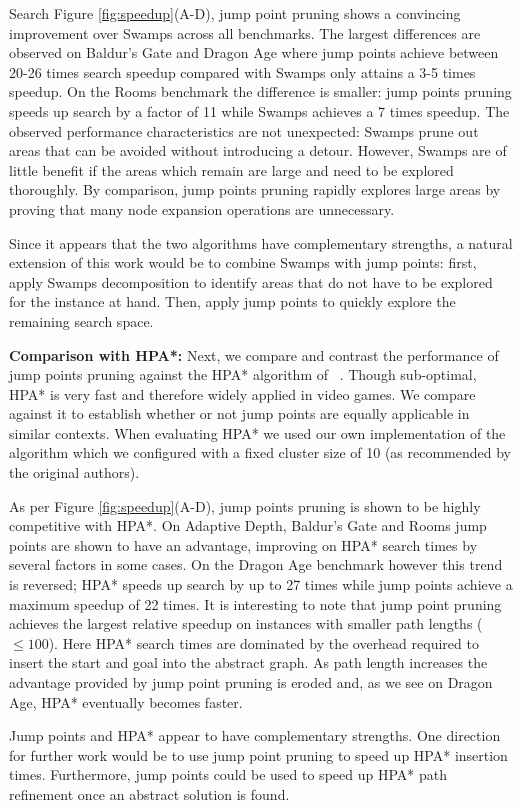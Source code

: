 Search Figure \ref{fig:speedup}(A-D), jump point pruning shows a convincing
improvement over Swamps across all benchmarks. 
The largest differences are observed on Baldur's Gate and Dragon Age where jump 
points achieve between 20-26 times search speedup compared with Swamps
only attains a 3-5 times speedup.
On the Rooms benchmark the difference is smaller: jump points pruning
speeds up search by a factor of 11 while Swamps achieves a 7 times
speedup.
The observed performance characteristics are not unexpected: Swamps prune out
areas that can be avoided without introducing a detour. However, Swamps are of
little benefit if the areas which remain are large and need to be explored 
thoroughly.
By comparison, jump points pruning rapidly explores large areas by proving
that many node expansion operations are unnecessary.
\par
Since it appears that the two algorithms have complementary strengths, a natural
extension of this work would be to combine Swamps with jump points:
first, apply Swamps decomposition to identify areas that do not have to be
explored for the instance at hand. Then, apply jump points to quickly explore the
remaining search space.
\par
\textbf{Comparison with HPA*: }
Next, we compare and contrast the performance of jump points pruning 
against the HPA* algorithm of \citeauthor{botea04}~.
Though sub-optimal, HPA* is very fast and therefore widely applied in video
games. We compare against it to establish whether or not jump points are 
equally applicable in similar contexts. 
When evaluating HPA* we used our own implementation of the algorithm which we 
configured with a fixed cluster size of 10 (as recommended by the original authors).
\par
As per Figure \ref{fig:speedup}(A-D), jump points pruning is shown to be 
highly competitive with HPA*.
On Adaptive Depth, Baldur's Gate and Rooms jump points are shown to have an 
advantage, improving on HPA* search times by several factors in some cases.
On the Dragon Age benchmark however this trend is reversed; HPA* speeds up
search by up to 27 times while jump points achieve a maximum speedup of 22
times.
It is interesting to note that jump point pruning achieves the largest relative
speedup on instances with smaller path lengths
($\leq 100$). Here HPA* search times are dominated by the overhead required to
insert the start and goal into the abstract graph.
As path length increases the advantage provided by jump point pruning is eroded
and, as we see on Dragon Age, HPA* eventually becomes faster.
\par
Jump points and HPA* appear to have complementary strengths.
One direction for further work would be to use jump point pruning to speed up
HPA* insertion times. Furthermore,  jump points could be used to speed up 
HPA* path refinement once an abstract solution is found.
